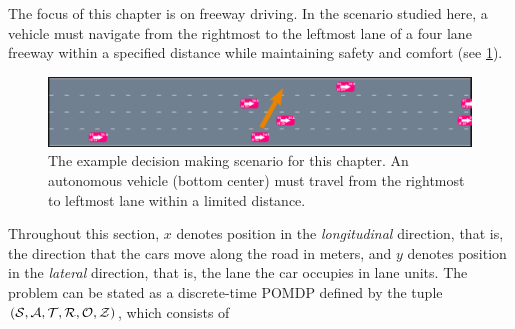 The focus of this chapter is on freeway driving.
In the scenario studied here, a vehicle must navigate from the rightmost to the leftmost lane of a four lane freeway within a specified distance while maintaining safety and comfort (see \cref{fig:scene}).

\begin{figure}[tb]
    \centering
    \includegraphics[width=\columnwidth]{media/scene.png}
    \caption[Lane changing scenario]{The example decision making scenario for this chapter. An autonomous vehicle (bottom center) must travel from the rightmost to leftmost lane within a limited distance.}
    \label{fig:scene}
\end{figure}

Throughout this section, $x$ denotes position in the \emph{longitudinal} direction, that is, the direction that the cars move along the road in meters, and $y$ denotes position in the \emph{lateral} direction, that is, the lane the car occupies in lane units.
The problem can be stated as a discrete-time POMDP defined by the tuple $(\mathcal{S}, \mathcal{A}, \mathcal{T}, \mathcal{R}, \mathcal{O}, \mathcal{Z})$, which consists of

